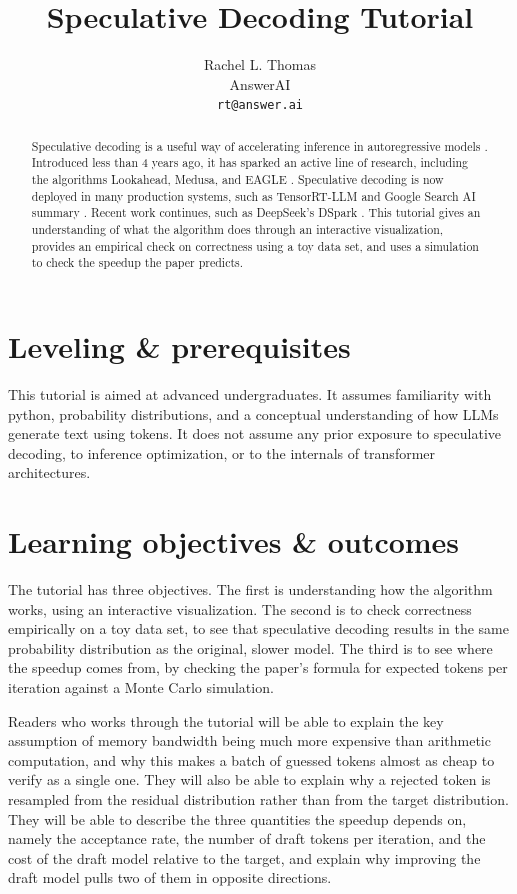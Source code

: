 \documentclass{article}
\title{Speculative Decoding Tutorial}
\author{%
  Rachel L. Thomas\\
  AnswerAI \\
  \texttt{rt@answer.ai} 
}
\begin{document}
\maketitle


\begin{abstract}
Speculative decoding is a useful way of accelerating inference in autoregressive models \citep{leviathan_fast_2023, chen_accelerating_2023}. Introduced less than 4 years ago, it has sparked an active line of research, including the algorithms Lookahead, Medusa, and EAGLE \citep{fu_break_2024, cai_medusa_2024, li_eagle_2024}. Speculative decoding is now deployed in many production systems, such as TensorRT-LLM and Google Search AI summary \citep{shah_boost_2024, leviathan_looking_2024}. Recent work continues, such as DeepSeek's DSpark \citep{cheng_dspark_2026}. This tutorial gives an understanding of what the algorithm does through an interactive visualization, provides an empirical check on correctness using a toy data set, and uses a simulation to check the speedup the paper predicts.

\end{abstract}

\section{Leveling \& prerequisites}

This tutorial is aimed at advanced undergraduates. It assumes familiarity with python, probability distributions, and a conceptual understanding of how LLMs generate text using tokens. It does not assume any prior exposure to speculative decoding, to inference optimization, or to the internals of transformer architectures.

\section{Learning objectives \& outcomes}

The tutorial has three objectives. The first is understanding how the algorithm works, using an interactive visualization. The second is to check correctness empirically on a toy data set, to see that speculative decoding results in the same probability distribution as the original, slower model. The third is to see where the speedup comes from, by checking the paper's formula for expected tokens per iteration against a Monte Carlo simulation.

Readers who works through the tutorial will be able to explain the key assumption of memory bandwidth being much more expensive than arithmetic computation, and why this makes a batch of guessed tokens almost as cheap to verify as a single one. They will also be able to explain why a rejected token is resampled from the residual distribution rather than from the target distribution. They will be able to describe the three quantities the speedup depends on, namely the acceptance rate, the number of draft tokens per iteration, and the cost of the draft model relative to the target, and explain why improving the draft model pulls two of them in opposite directions.
\end{document}
